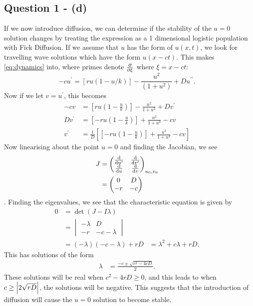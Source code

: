 \documentclass[11pt,a4paper]{article}
\begin{document}
\subsection{Question 1 - (d)}
\label{sec:question1:subsec:partd}
If we now introduce diffusion, we can determine if the stability of the $u=0$ solution changes by treating the expression as a 1 dimensional logistic population with Fick Diffusion. If we assume that $u$ has the form of $u(x,t)$, we look for travelling wave solutions which have the form $u(x-ct)$. This makes \eqref{eq:dynamics} into, where primes denote $\pdv{\xi}$ where $\xi = x - ct$:
$$ - c u^\prime = \left[ ru  \left(1 - u/k \right) \right] - \frac{u^2}{(1+u^2)} + D u^{\prime \prime}. $$
Now if we let $v=u^\prime$, this becomes 
\begin{align*}
-cv &= \left[ ru \left( 1 - \frac{u}{k} \right) \right] - \frac{u^2}{1+u^2} + D v^\prime \\
D v^\prime &= \left[ -ru \left( 1 - \frac{u}{k} \right) \right] + \frac{u^2}{1+u^2} - cv \\
v^\prime &= \frac{1}{D} \left[ \left[ - ru \left( 1 - \frac{u}{k} \right) \right] + \frac{u^2}{1+u^2} - cv \right]
\end{align*}
Now linearising about the point $u=0$ and finding the Jacobian, we see 
\begin{align*}
J &= \begin{pmatrix}
\dv{u^\prime} & \dv{v^\prime} \\
\dv{u} & \dv{v}
\end{pmatrix}_{u_0,v_0} \\
&=\begin{pmatrix}
0 & D \\
-r & -c 
\end{pmatrix}
\end{align*}.
Finding the eigenvalues, we see that the characteristic equation is given by 
\begin{align*}
0 &= \det(J - I \lambda) \\
&= \begin{vmatrix}
-\lambda & D \\
-r & -c-\lambda
\end{vmatrix}\\
&= (-\lambda) (-c - \lambda) + rD
&= \lambda^2 + c \lambda + rD .
\end{align*}
This has solutions of the form 
\begin{align*}
\lambda &= \frac{- c \pm \sqrt{c^2 - 4 rD}}{2}.
\end{align*}
These solutions will be real when $c^2 - 4 rD  \geq 0 $, and this leads to when $c \geq \abs{2 \sqrt{r D}}$, the solutions will be negative. This suggests that the introduction of diffusion will cause the $u = 0 $ solution to become stable. 
\end{document}
